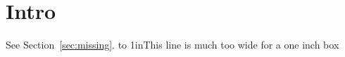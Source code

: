 \section{Intro}
\label{sec:intro}
See Section~\ref{sec:missing}.
\hbox to 1in{This line is much too wide for a one inch box}
